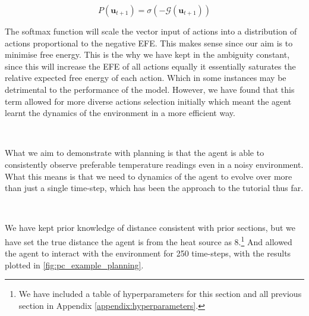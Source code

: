 \documentclass{article}
\begin{document}
\begin{equation}
	P(\textbf{u}_{t+1}) = \sigma( - \mathcal{G}(\textbf{u}_{t+1}) )
\end{equation}

The softmax function will scale the vector input of actions into a distribution of actions proportional to the negative EFE. This makes sense since our aim is to minimise free energy. This is the why we have kept in the ambiguity constant, since this will increase the EFE of all actions equally it essentially saturates the relative expected free energy of each action. Which in some instances may be detrimental to the performance of the model. However, we have found that this term allowed for more diverse actions selection initially which meant the agent learnt the dynamics of the environment in a more efficient way.

\

What we aim to demonstrate with planning is that the agent is able to consistently observe preferable temperature readings even in a noisy environment. What this means is that we need to dynamics of the agent to evolve over more than just a single time-step, which has been the approach to the tutorial thus far.

\

We have kept prior knowledge of distance consistent with prior sections, but we have set the true distance the agent is from the heat source as 8.\footnote{We have included a table of hyperparameters for this section and all previous section in Appendix \ref{appendix:hyperparameters}.} And allowed the agent to interact with the environment for 250 time-steps, with the results plotted in \ref{fig:pc_example_planning}. 
\end{document}
